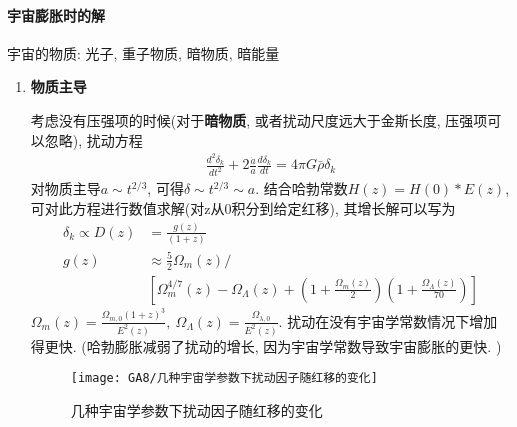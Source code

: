 \paragraph{宇宙膨胀时的解}
宇宙的物质: 光子, 重子物质, 暗物质, 暗能量

\begin{enumerate}
    \item \textbf{物质主导}
    
    \subitem 考虑没有压强项的时候(对于\textbf{暗物质}, 或者扰动尺度远大于金斯长度, 压强项可以忽略),
    扰动方程
    \begin{align*}
        \frac{d^2\delta_k}{d t^2}+2\frac{\dot{a}}{a}\frac{d\delta_k}{dt}= 4\pi G \bar\rho\delta_k 
    \end{align*}
    对物质主导$a\sim t^{2/3}$, 可得$\delta\sim t^{2/3}\sim a$. 结合哈勃常数$H(z)=H(0)*E(z)$, 可对此方程进行数值求解(对z从0积分到给定红移), 其增长解可以写为
    {\small
    \begin{align*}
        \delta_k\propto D(z)&=\frac{g(z)}{(1+z)}\\
        g(z)&\approx \frac{5}{2}\Omega_m(z)/\\
        &\left[ \Omega_m^{4/7}(z)-\Omega_\Lambda(z)+\left( 1+\frac{\Omega_m(z)}{2} \right)\left( 1+\frac{\Omega_\Lambda(z)}{70} \right) \right]
    \end{align*}
    }$\displaystyle \Omega_m(z)=\frac{\Omega_{m,0}(1+z)^3}{E^2(z)},\ \Omega_\Lambda(z)=\frac{\Omega_{\lambda, 0}}{E^2(z)}$. 扰动在没有宇宙学常数情况下增加得更快. (哈勃膨胀减弱了扰动的增长, 因为宇宙学常数导致宇宙膨胀的更快. )
    
    \begin{figure}[!htb]
        \centering
        \texttt{[image: GA8/几种宇宙学参数下扰动因子随红移的变化]}
        \caption{几种宇宙学参数下扰动因子随红移的变化}
    \end{figure}
    

\end{enumerate}
